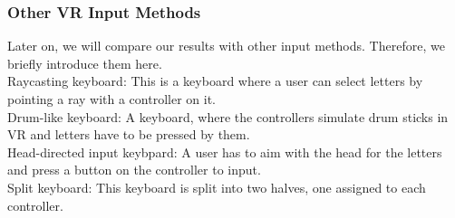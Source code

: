 \subsubsection{Other VR Input Methods}
Later on, we will compare our results with other input methods. Therefore, we briefly introduce them here.\\
Raycasting keyboard: This is a keyboard where a user can select letters by pointing a ray with a controller on it.\\
Drum-like keyboard: A keyboard, where the controllers simulate drum sticks in VR and letters have to be pressed by them.\\
Head-directed input keybpard: A user has to aim with the head for the letters and press a button on the controller to input.\\
Split keyboard: This keyboard is split into two halves, one assigned to each controller. \label{sec:other_keyboards}